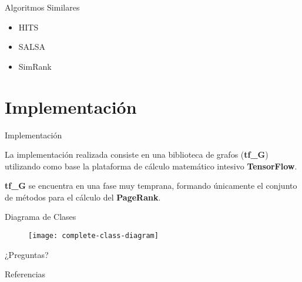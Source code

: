 \documentclass[12pt]{beamer}
\begin{document}
    \begin{frame}[fragile]{Algoritmos Similares}

      \begin{itemize}
        \item HITS
        \item SALSA
        \item SimRank
      \end{itemize}

    \end{frame}

  \section{Implementación}


    \begin{frame}[fragile]{Implementación}

      La implementación realizada consiste en una biblioteca de grafos (\textbf{tf\_G}) utilizando como base la plataforma de cálculo matemático intesivo \textbf{TensorFlow}.

      \textbf{tf\_G} se encuentra en una fase muy temprana, formando únicamente el conjunto de métodos para el cálculo del \textbf{PageRank}.

    \end{frame}

    \begin{frame}[fragile]{Diagrama de Clases}

      \begin{figure}
        \texttt{[image: complete-class-diagram]}
        \caption{}
        \label{}
      \end{figure}

    \end{frame}


  \begin{frame}[standout]
    ¿Preguntas?
  \end{frame}


  \begin{frame}[allowframebreaks]{Referencias}

    
    

  \end{frame}
\end{document}
